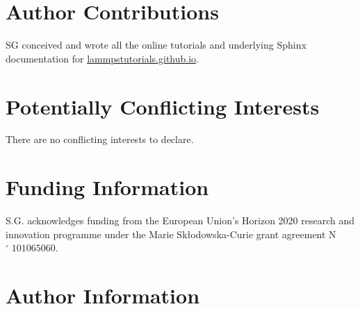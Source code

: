 \documentclass[9pt,tutorial]{livecoms}
\begin{document}
\section*{Author Contributions}

SG conceived and wrote all the online tutorials and underlying Sphinx documentation for \href{https://lammpstutorials.github.io}{lammpstutorials.github.io}.

\section*{Potentially Conflicting Interests}

There are no conflicting interests to declare.

\section*{Funding Information}

S.G. acknowledges funding from the European Union's Horizon 2020 research and innovation programme under the Marie Skłodowska-Curie grant agreement N$^\circ\;101065060$.

\section*{Author Information}
\makeorcid



\end{document}
